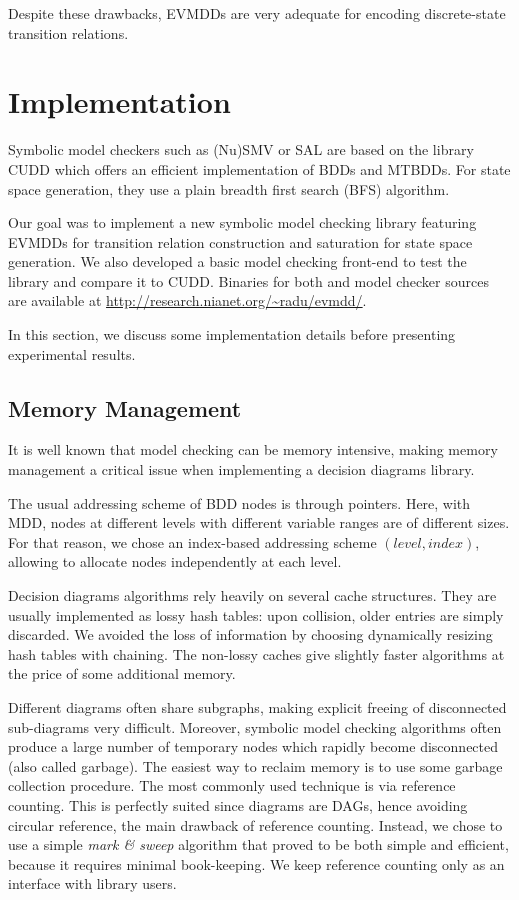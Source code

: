 \documentclass[a4paper,oneside,11pt,pdftex]{llncs}
\begin{document}
Despite these drawbacks, EVMDDs are very adequate for encoding discrete-state transition relations.

\section{Implementation}

Symbolic model checkers such as (Nu)SMV\cite{NuSMV} or SAL\cite{SAL}
are based on the library CUDD\cite{CUDD} which offers an efficient
implementation of BDDs and MTBDDs. For state space generation, they
use a plain breadth first search (BFS) algorithm.

Our goal was to implement a new symbolic model checking library featuring
EVMDDs for transition relation construction and saturation\cite{Saturation2001}
for state space generation. We also developed a basic
model checking front-end to test the library and compare it to CUDD.
Binaries for both and model checker sources are available
at \url{http://research.nianet.org/~radu/evmdd/}.

In this section, we discuss some implementation details
before presenting experimental results.

\subsection{Memory Management}

It is well known that model checking can be memory intensive,
making memory management a critical issue when implementing
a decision diagrams library.

The usual addressing scheme of BDD nodes is through pointers.
Here, with MDD, nodes at different levels with different
variable ranges are of different sizes. For that reason, we chose
an index-based addressing scheme $(level, index)$, allowing to allocate nodes
independently at each level.

Decision diagrams algorithms rely heavily on several cache structures.
They are usually implemented as lossy hash tables: upon collision, older entries
are simply discarded. 
We avoided the loss of information by choosing dynamically resizing hash tables with chaining.
The non-lossy caches give slightly faster algorithms at the price
of some additional memory.

Different diagrams often share subgraphs, making explicit freeing
of disconnected sub-diagrams very difficult. Moreover,
symbolic model checking algorithms often produce a large number of temporary
nodes which rapidly become disconnected (also called garbage). 
The easiest way to reclaim
memory is to use some garbage collection procedure.
The most commonly used technique is via reference counting.
This is perfectly suited since diagrams are DAGs, hence avoiding
circular reference, the main drawback of reference counting. 
Instead, we chose to use a simple \emph{mark \& sweep} algorithm that proved
to be both simple and efficient, because it requires minimal book-keeping.
We keep reference counting only as an interface with library users.
\end{document}
